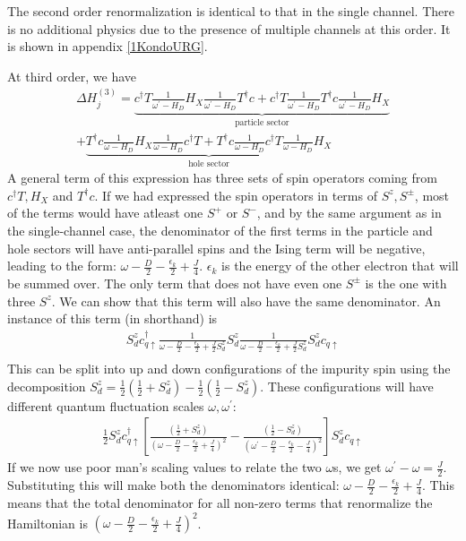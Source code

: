 \documentclass[12pt]{revtex4-2}
\begin{document}
The second order renormalization is identical to that in the single channel. There is no additional physics due to the presence of multiple channels at this order. It is shown in appendix \ref{1KondoURG}.

At third order, we have
\begin{align}
	\label{3rd_oder_terms}
	\Delta H^{(3)}_j = \underbrace{c^\dagger T \frac{1}{\omega^\prime - H_D} H_X \frac{1}{\omega^\prime - H_D} T^\dagger c + c^\dagger T \frac{1}{\omega^\prime - H_D} T^\dagger c \frac{1}{\omega^\prime - H_D} H_X}_\text{particle sector}\nonumber\\
	+ \underbrace{T^\dagger c \frac{1}{\omega - H_D} H_X \frac{1}{\omega - H_D} c^\dagger T + T^\dagger c \frac{1}{\omega - H_D} c^\dagger T \frac{1}{\omega - H_D} H_X}_\text{hole sector}
\end{align}
A general term of this expression has three sets of spin operators coming from \(c^\dagger T, H_X\) and \(T^\dagger c\). If we had expressed the spin operators in terms of \(S^z, S^\pm\), most of the terms would have atleast one \(S^+\) or \(S^-\), and by the same argument as in the single-channel case, the denominator of the first terms in the particle and hole sectors will have anti-parallel spins and the Ising term will be negative, leading to the form: \(\omega - \frac{D}{2} -  \frac{\epsilon_k}{2} + \frac{J}{4}\). \(\epsilon_k\) is the energy of the other electron that will be summed over. The only term that does not have even one \(S^\pm\) is the one with three \(S^z\). We can show that this term will also have the same denominator. An instance of this term (in shorthand) is
\begin{align}
	S_d^z c^\dagger_{q \uparrow} \frac{1}{\omega - \frac{D}{2} - \frac{\epsilon_k}{2} + \frac{J}{2} S_d^z} S_d^z \frac{1}{\omega - \frac{D}{2} - \frac{\epsilon_k}{2} + \frac{J}{2} S_d^z} S_d^z c_{q \uparrow}\\
\end{align}
This can be split into up and down configurations of the impurity spin using the decomposition \(S_d^z = \frac{1}{2}\left(\frac{1}{2} + S_d^z\right) - \frac{1}{2}\left(\frac{1}{2} - S_d^z \right) \). These configurations will have different quantum fluctuation scales \(\omega, \omega^\prime\):
\begin{align}
	\frac{1}{2}S_d^z c^\dagger_{q \uparrow}\left[\frac{\left(\frac{1}{2} + S_d^z\right)}{\left(\omega - \frac{D}{2} - \frac{\epsilon_k}{2} + \frac{J}{4}\right)^2} - \frac{\left(\frac{1}{2} - S_d^z\right)}{\left(\omega^\prime - \frac{D}{2} - \frac{\epsilon_k}{2} - \frac{J}{4}\right)^2}\right]S_d^z c_{q \uparrow}
\end{align}
If we now use poor man's scaling values to relate the two \(\omega\)s, we get \(\omega^\prime - \omega = \frac{J}{2}\). Substituting this will make both the denominators identical: \(\omega - \frac{D}{2} - \frac{\epsilon_k}{2} + \frac{J}{4}\). This means that the total denominator for all non-zero terms that renormalize the Hamiltonian is \(\left(\omega - \frac{D}{2} -  \frac{\epsilon_k}{2} + \frac{J}{4}\right)^2\).
\end{document}
